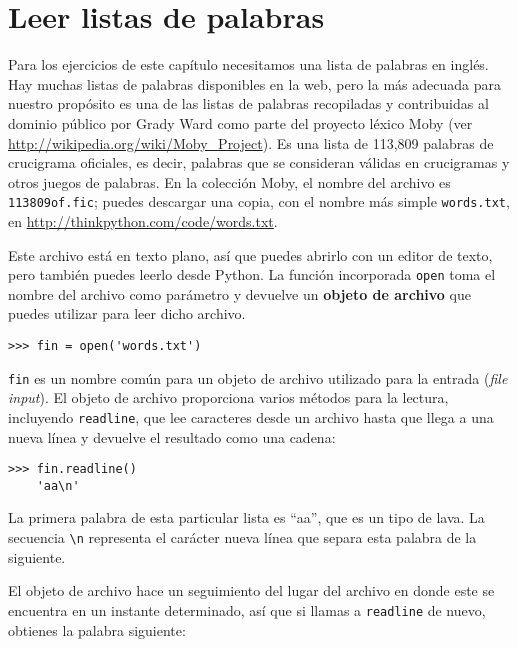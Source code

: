 \documentclass[10pt]{book}
\begin{document}
\section{Leer listas de palabras}
\label{wordlist}

Para los ejercicios de este capítulo necesitamos una lista de palabras en inglés.
Hay muchas listas de palabras disponibles en la web, pero la más
adecuada para nuestro propósito es una de las listas de palabras recopiladas y
contribuidas al dominio público por Grady Ward como parte del proyecto léxico Moby
(ver \url{http://wikipedia.org/wiki/Moby_Project}).  Es
una lista de 113,809 palabras de crucigrama oficiales, es decir, palabras que se
consideran válidas en crucigramas y otros juegos de palabras.  En la
colección Moby, el nombre del archivo es {\tt 113809of.fic}; puedes descargar
una copia, con el nombre más simple {\tt words.txt}, en
\url{http://thinkpython.com/code/words.txt}.

Este archivo está en texto plano, así que puedes abrirlo con un editor
de texto, pero también puedes leerlo desde Python.  La función incorporada
{\tt open} toma el nombre del archivo como parámetro
y devuelve un {\bf objeto de archivo} que puedes utilizar para leer dicho archivo.


\begin{verbatim}
>>> fin = open('words.txt')
\end{verbatim}
%
{\tt fin} es un nombre común para un objeto de archivo utilizado para la entrada ({\em file input}).  El objeto
de archivo proporciona varios métodos para la lectura, incluyendo {\tt readline},
que lee caracteres desde un archivo hasta que llega a una nueva línea y
devuelve el resultado como una cadena: 

\begin{verbatim}
>>> fin.readline()
    'aa\n'
\end{verbatim}
%
La primera palabra de esta particular lista es ``aa'', que es un tipo de
lava.  La secuencia \verb"\n" representa el carácter nueva línea que
separa esta palabra de la siguiente.

El objeto de archivo hace un seguimiento del lugar del archivo en donde este se encuentra en un instante determinado, así que
si llamas a {\tt readline} de nuevo, obtienes la palabra siguiente:
\end{document}
